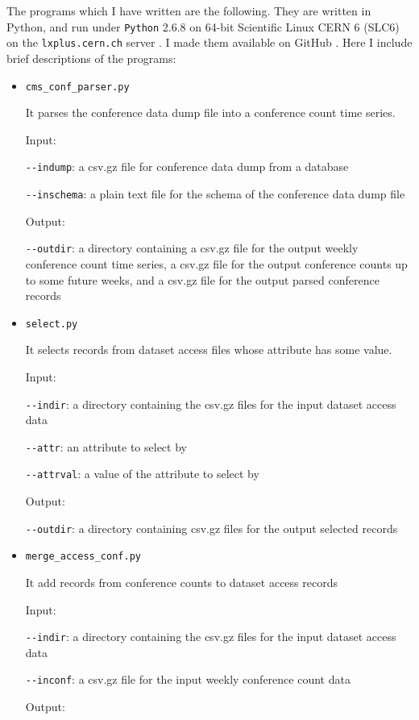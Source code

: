 \documentclass[preprint, 12pt]{elsarticle}
\begin{document}
The programs which I have written are the following. They are written in Python, and run under \verb|Python| 2.6.8 on 64-bit Scientific Linux CERN 6 (SLC6) on the \verb|lxplus.cern.ch| server \cite{web:lxplus}. I made them  available on GitHub \cite{web:tlgithub}. Here I include brief descriptions of the programs:

\begin{itemize}
\item \verb|cms_conf_parser.py|
  
  It parses the conference data dump file into a conference count time series.

  Input:

  \verb|--indump|: a csv.gz file for conference data dump from a database

  \verb|--inschema|: a plain text file for the schema of the conference data dump file

  Output:

  \verb|--outdir|: a directory containing  a csv.gz file for the output weekly conference count time series, a csv.gz file for the output conference counts up to some future weeks, and a csv.gz file for the output parsed conference records
  
  
\item \verb|select.py|

  It selects records from dataset access files whose attribute has some value.

  Input:
  
  \verb|--indir|: a directory containing the csv.gz files for the input dataset access data

  \verb|--attr|: an attribute to select by

  \verb|--attrval|: a value of the attribute to select by

  Output:

  \verb|--outdir|: a directory containing csv.gz files for the output selected records

\item \verb|merge_access_conf.py|

  It add records from conference counts to dataset access records

  Input:

  \verb|--indir|: a directory containing the csv.gz files for the input dataset access data

  \verb|--inconf|: a csv.gz file for the input weekly conference count data

  Output:


\end{itemize}
\end{document}
